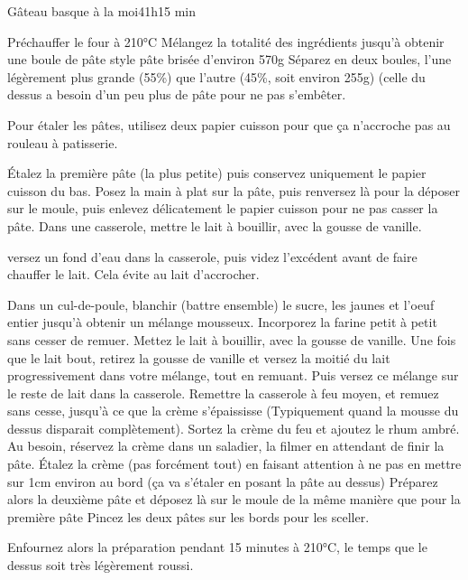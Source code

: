 {\begin{recette}{Gâteau basque à la moi}{4}{1h}{15 min}
\begin{preparation}
\etape Préchauffer le four à 210°C
\etape Mélangez la totalité des ingrédients jusqu'à obtenir une boule de pâte style pâte brisée d'environ 570g
\etape Séparez en deux boules, l'une légèrement plus grande (55\%) que l'autre (45\%, soit environ 255g) (celle du dessus a besoin d'un peu plus de pâte pour ne 
pas s'embêter.
\begin{remarque}
Pour étaler les pâtes, utilisez deux papier cuisson pour que ça n'accroche pas au rouleau à patisserie.\end{remarque}
\etape  Étalez la première pâte (la plus petite) puis conservez uniquement le papier cuisson du bas. Posez la main à plat sur la pâte, puis renversez là pour la déposer sur le moule, puis enlevez délicatement le papier cuisson pour ne pas casser la pâte.
\etape Dans une casserole, mettre le lait à bouillir, avec la gousse de vanille. 
\begin{remarque}
versez un fond d'eau dans la casserole, puis videz l’excédent avant de faire chauffer le lait. Cela évite au lait d'accrocher.
\end{remarque}
\etape Dans un cul-de-poule, blanchir (battre ensemble) le sucre, les jaunes et l'oeuf entier jusqu'à obtenir un mélange mousseux.
\etape Incorporez la farine petit à petit sans cesser de remuer.
\etape Mettez le lait à bouillir, avec la gousse de vanille. Une fois que le lait bout, retirez la gousse de vanille et versez la moitié du lait progressivement dans votre mélange, tout en remuant.
\etape Puis versez ce mélange sur le reste de lait dans la casserole. Remettre la casserole à feu moyen, et remuez sans cesse, jusqu'à ce que la crème s'épaississe (Typiquement quand la mousse du dessus disparait complètement).
\etape Sortez la crème du feu et ajoutez le rhum ambré.
\etape Au besoin, réservez la crème dans un saladier, la filmer en attendant de finir la pâte.
\etape Étalez la crème (pas forcément tout) en faisant attention à ne pas en mettre sur 1cm environ au bord (ça va s'étaler en posant la pâte au dessus)
\etape Préparez alors la deuxième pâte et déposez là sur le moule de la même manière que pour la première pâte
\etape Pincez les deux pâtes sur les bords pour les sceller.

\end{preparation}

\begin{cuisson}
Enfournez alors la préparation pendant 15 minutes à 210°C, le temps que le dessus soit très légèrement roussi.
\end{cuisson}
\end{recette}


}
